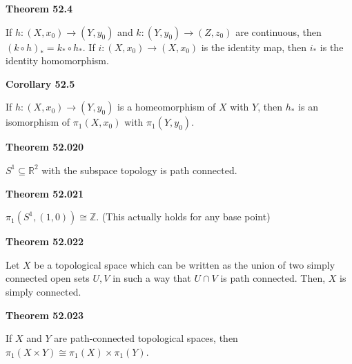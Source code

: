 \documentclass{article}
\begin{document}
\medskip\noindent\textbf{Theorem 52.4}

    If $h: (X, x_0) \to (Y, y_0)$ and $k: (Y, y_0) \to (Z, z_0)$ are continuous, then $(k \circ h)_* = k_* \circ h_*$.
    If  $i: (X, x_0) \to (X, x_0)$ is the identity map, then $i_*$ is the identity homomorphism.

\medskip\noindent\textbf{Corollary 52.5}

    If $h: (X, x_0) \to (Y, y_0)$ is a homeomorphism of $X$ with $Y$, then $h_*$ is an isomorphism of $\pi_1(X, x_0)$ with $\pi_1(Y, y_0)$.

\medskip\noindent\textbf{Theorem 52.020}

    $S^1 \subseteq \mathbb R^2$ with the subspace topology is path connected.

\medskip\noindent\textbf{Theorem 52.021}

    $\pi_1(S^1, (1,0)) \cong \mathbb Z$. (This actually holds for any base point)

\medskip\noindent\textbf{Theorem 52.022}

    Let $X$ be a topological space which can be written as the union of two simply connected open sets $U, V$ in such a way that $U \cap V$ is path connected.
    Then, $X$ is simply connected.

\medskip\noindent\textbf{Theorem 52.023}

    If $X$ and $Y$ are path-connected topological spaces, then $\pi_1(X \times Y) \cong \pi_1(X) \times \pi_1(Y)$.
\end{document}

